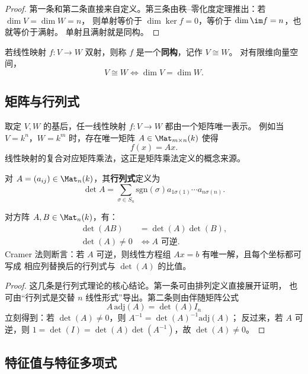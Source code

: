 \begin{proof}
第一条和第二条直接来自定义。第三条由秩--零化度定理推出：若 $\dim V=\dim W=n$，
则单射等价于 $\dim\ker f=0$，等价于 $\dim\im f=n$，也就等价于满射。
单射且满射就是同构。
\end{proof}

\begin{definition}[同构]
若线性映射 $f\colon V\to W$ 双射，则称 $f$ 是一个\textbf{同构}，记作 $V\cong W$。
对有限维向量空间，
\[
  V\cong W \iff \dim V = \dim W.
\]
\end{definition}

\subsection{矩阵与行列式}

取定 $V,W$ 的基后，任一线性映射 $f\colon V\to W$ 都由一个矩阵唯一表示。
例如当 $V=k^n$，$W=k^m$ 时，存在唯一矩阵 $A\in \Mat_{m\times n}(k)$ 使得
\[
  f(x)=Ax.
\]
线性映射的复合对应矩阵乘法，这正是矩阵乘法定义的概念来源。

\begin{definition}[行列式]
对 $A=(a_{ij})\in \Mat_n(k)$，其\textbf{行列式}定义为
\begin{equation}
  \det A = \sum_{\sigma\in S_n} \mathrm{sgn}(\sigma)
  a_{1\sigma(1)}\cdots a_{n\sigma(n)}.
\end{equation}
\end{definition}

\begin{proposition}
对方阵 $A,B\in \Mat_n(k)$，有：
\begin{align}
  \det(AB) &= \det(A)\det(B), \\
  \det(A)\neq 0 &\iff A\text{ 可逆}.
\end{align}
Cramer 法则断言：若 $A$ 可逆，则线性方程组 $Ax=b$ 有唯一解，且每个坐标都可写成
相应列替换后的行列式与 $\det(A)$ 的比值。
\end{proposition}

\begin{proof}
这几条是行列式理论的核心结论。第一条可由排列定义直接展开证明，
也可由“行列式是交替 $n$ 线性形式”导出。第二条则由伴随矩阵公式
\[
  A\,\mathrm{adj}(A)=\det(A)I_n
\]
立刻得到：若 $\det(A)\neq 0$，则 $A^{-1}=\det(A)^{-1}\mathrm{adj}(A)$；
反过来，若 $A$ 可逆，则 $1=\det(I)=\det(A)\det(A^{-1})$，故 $\det(A)\neq 0$。
\end{proof}

\subsection{特征值与特征多项式}


